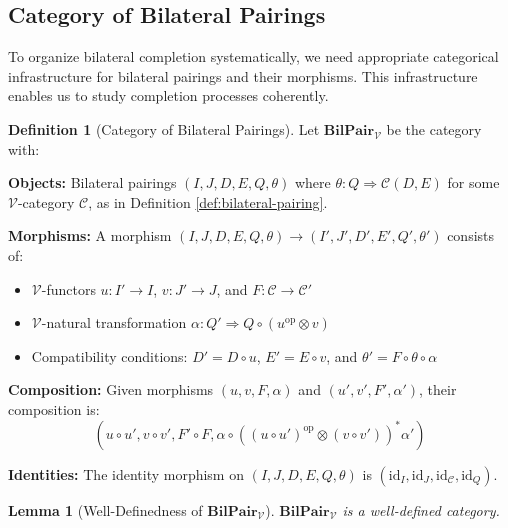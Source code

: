 \documentclass[11pt]{article}
\theoremstyle{plain}
\newtheorem{lemma}[theorem]{Lemma}
\theoremstyle{definition}
\newtheorem{definition}[theorem]{Definition}
\theoremstyle{remark}
\newcommand{\V}{\mathcal{V}}
\newcommand{\C}{\mathcal{C}}
\newcommand{\op}{\mathrm{op}}
\newcommand{\id}{\mathrm{id}}
\begin{document}
\subsection{Category of Bilateral Pairings}

To organize bilateral completion systematically, we need appropriate categorical infrastructure for bilateral pairings and their morphisms. This infrastructure enables us to study completion processes coherently.

\begin{definition}[Category of Bilateral Pairings]\label{def:bilpair-category}
Let $\mathbf{BilPair}_\V$ be the category with:

\textbf{Objects:} Bilateral pairings $(I, J, D, E, Q, \theta)$ where $\theta : Q \Rightarrow \C(D, E)$ for some $\V$-category $\C$, as in Definition \ref{def:bilateral-pairing}.

\textbf{Morphisms:} A morphism $(I, J, D, E, Q, \theta) \to (I', J', D', E', Q', \theta')$ consists of:
\begin{itemize}
\item $\V$-functors $u : I' \to I$, $v : J' \to J$, and $F : \C \to \C'$
\item $\V$-natural transformation $\alpha : Q' \Rightarrow Q \circ (u^{\op} \otimes v)$
\item Compatibility conditions: $D' = D \circ u$, $E' = E \circ v$, and $\theta' = F \circ \theta \circ \alpha$
\end{itemize}

\textbf{Composition:} Given morphisms $(u, v, F, \alpha)$ and $(u', v', F', \alpha')$, their composition is:
$$(u \circ u', v \circ v', F' \circ F, \alpha \circ ((u \circ u')^{\op} \otimes (v \circ v'))^* \alpha')$$

\textbf{Identities:} The identity morphism on $(I, J, D, E, Q, \theta)$ is $(\id_I, \id_J, \id_\C, \id_Q)$.
\end{definition}

\begin{lemma}[Well-Definedness of $\mathbf{BilPair}_\V$]\label{lem:bilpair-welldef}
$\mathbf{BilPair}_\V$ is a well-defined category.
\end{lemma}
\end{document}

